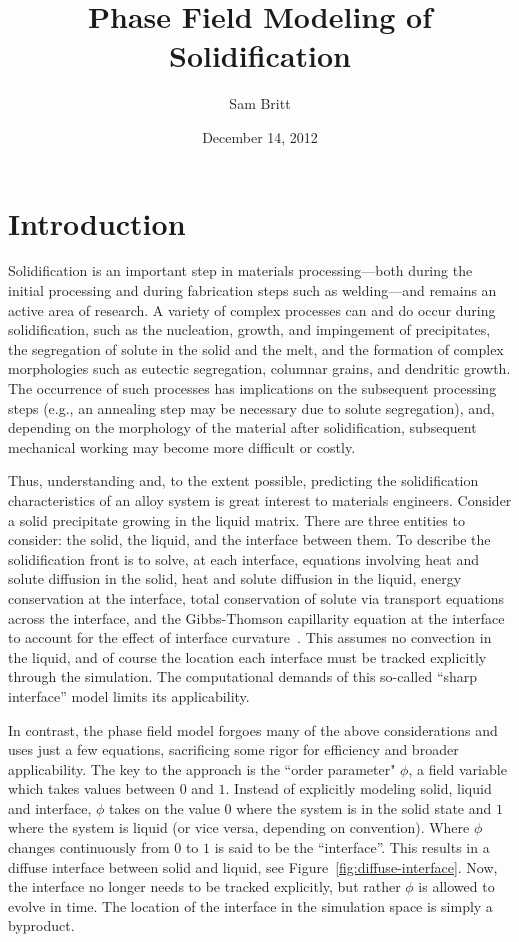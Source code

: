 \documentclass[12pt]{article}
\title{Phase Field Modeling of Solidification}
\author{Sam Britt}
\date{December 14, 2012}
\begin{document}
\maketitle

\section{Introduction}
Solidification is an important step in materials processing---both
during the initial processing and during fabrication steps such as
welding---and remains an active area of research. A variety of
complex processes can and do occur during solidification, such as the
nucleation, growth, and impingement of precipitates, the segregation
of solute in the solid and the melt, and the formation of complex
morphologies such as eutectic segregation, columnar grains, and
dendritic growth. The occurrence of such processes has implications on
the subsequent processing steps (e.g., an annealing step may be
necessary due to solute segregation), and, depending on the morphology
of the material after solidification, subsequent mechanical working
may become more difficult or costly.

Thus, understanding and, to the extent possible, predicting the
solidification characteristics of an alloy system is great interest to
materials engineers. Consider a solid precipitate growing in the
liquid matrix. There are three entities to consider: the solid, the
liquid, and the interface between them. To describe the solidification
front is to solve, at each interface, equations involving heat and
solute diffusion in the solid, heat and solute diffusion in the
liquid, energy conservation at the interface, total conservation of
solute via transport equations across the interface, and the
Gibbs-Thomson capillarity equation at the interface to account for the
effect of interface curvature~\cite{Qin2010}. This assumes no
convection in the liquid, and of course the location each interface
must be tracked explicitly through the simulation. The computational
demands of this so-called ``sharp interface'' model limits its
applicability.

In contrast, the phase field model forgoes many of the above
considerations and uses just a few equations, sacrificing some rigor
for efficiency and broader applicability. The key to the approach
is the ``order parameter" $\phi$, a field variable which takes values
between $0$ and $1$. Instead of explicitly modeling solid, liquid and
interface, $\phi$ takes on the value $0$ where the system is in the
solid state and $1$ where the system is liquid (or vice versa,
depending on convention). Where $\phi$ changes continuously from $0$
to $1$ is said to be the ``interface''. This results in a diffuse
interface between solid and liquid, see
Figure~\ref{fig:diffuse-interface}. Now, the interface no longer needs
to be tracked explicitly, but rather $\phi$ is allowed to evolve in
time. The location of the interface in the simulation space is simply
a byproduct.
\end{document}
